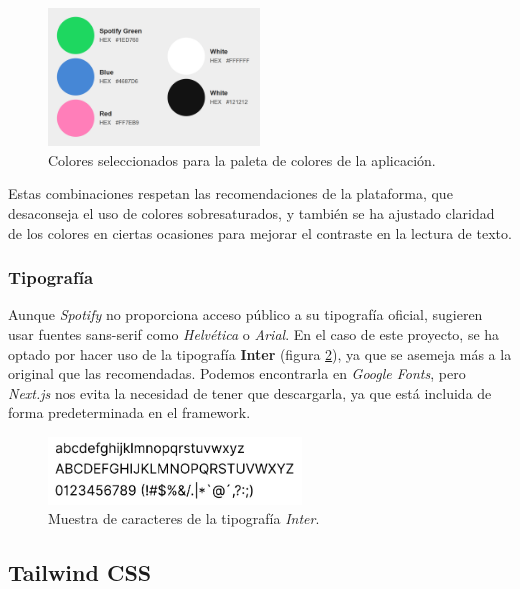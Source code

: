 \begin{figure}[H]
    \centering
    \includegraphics[width=0.5\textwidth]{figures/colores_usados.png}
    \vspace{0.3cm}
    \caption{Colores seleccionados para la paleta de colores de la aplicación.}
    \label{fig:colores_usados}
\end{figure}

Estas combinaciones respetan las recomendaciones de la plataforma, que desaconseja el uso de colores sobresaturados, y también se ha ajustado claridad de los colores en ciertas ocasiones para mejorar el contraste en la lectura de texto.

\subsubsection*{Tipografía}

Aunque \textit{Spotify} no proporciona acceso público a su tipografía oficial, sugieren usar fuentes sans-serif como \textit{Helvética} o \textit{Arial}. En el caso de este proyecto, se ha optado por hacer uso de la tipografía \textbf{Inter} (figura \ref{fig:inter_fuente}), ya que se asemeja más a la original que las recomendadas. Podemos encontrarla en \textit{Google Fonts}, pero \textit{Next.js} nos evita la necesidad de tener que descargarla, ya que está incluida de forma predeterminada en el framework.

\begin{figure}[H]
    \centering
    \includegraphics[width=0.6\textwidth]{figures/inter_fuente.png}
    \vspace{0.1cm}
    \caption{Muestra de caracteres de la tipografía \textit{Inter}.}
    \label{fig:inter_fuente}
\end{figure}

\subsection{Tailwind CSS}

